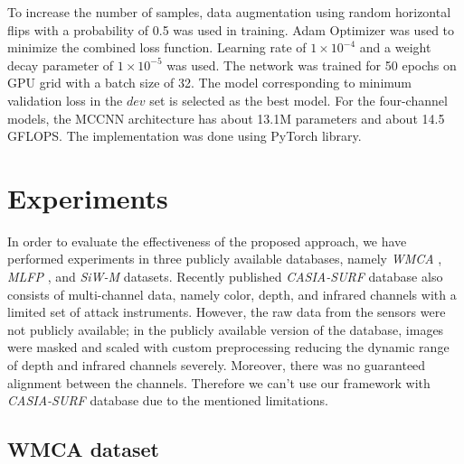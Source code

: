 \documentclass[journal]{IEEEtran}
\begin{document}
To increase the number of samples, data augmentation using random horizontal flips with a probability of 0.5 was used in training. Adam Optimizer \cite{kingma2014adam} was used to minimize the combined loss function. Learning rate of $1\times10^{-4}$ and a weight decay parameter of  $1\times10^{-5}$ was used. The network was trained for 50 epochs on GPU grid with a batch size of 32. The model corresponding to minimum validation loss in the $dev$ set is selected as the best model. For the four-channel models, the MCCNN architecture has about 13.1M parameters and about 14.5 GFLOPS. The implementation was done using PyTorch \cite{paszke2017automatic} library.


\section{Experiments}

In order to evaluate the effectiveness of the proposed approach, we have performed experiments in three publicly available databases, namely \textit{WMCA} \cite{george_mccnn_tifs2019}, \textit{MLFP} \cite{agarwal2017face}, and \textit{SiW-M} \cite{Liu_2019_CVPR} datasets.
Recently published \textit{CASIA-SURF} \cite{zhang2018casia} database also consists of multi-channel data, namely color, depth, and infrared channels with a limited set of attack instruments. However, the raw data from the sensors were not publicly available; in the publicly available version of the database, images were masked and scaled with custom preprocessing reducing the dynamic range of depth and infrared channels severely. Moreover, there was no guaranteed alignment between the channels. Therefore we can't use our framework with \textit{CASIA-SURF} database due to the mentioned limitations.

\subsection{WMCA dataset}
\end{document}
